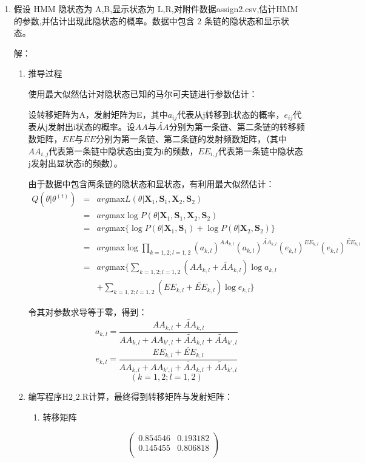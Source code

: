\documentclass{ctexart}
\begin{document}
\begin{enumerate}
\item 假设 HMM 隐状态为 A,B,显示状态为 L,R,对附件数据assign2.csv,估计HMM 的参数,并估计出现此隐状态的概率。数据中包含 2 条链的隐状态和显示状态。

解：
\begin{enumerate}

\item 推导过程

使用最大似然估计对隐状态已知的马尔可夫链进行参数估计：

设转移矩阵为A，发射矩阵为E，其中\(a_{ij}\)代表从j转移到i状态的概率，\(e_{ij}\)代表从j发射出i状态的概率。设\(AA与\tilde{AA}\)分别为第一条链、第二条链的转移频数矩阵，\(EE与\tilde{EE}\)分别为第一条链、第二条链的发射频数矩阵，（其中\(AA_{i,j}\)代表第一条链中隐状态由j变为i的频数，\(EE_{i,j}\)代表第一条链中隐状态j发射出显状态i的频数）。 

由于数据中包含两条链的隐状态和显状态，有利用最大似然估计：
\begin{eqnarray*}
Q(\theta|\theta^{(t)})&=&arg \mbox{max}L(\theta | \bm{X}_1,\bm{S}_1,\bm{X}_2,\bm{S}_2) \\
&=& arg \mbox{max} \log P(\theta | \bm{X}_1,\bm{S}_1,\bm{X}_2,\bm{S}_2) \\
&=&arg \mbox{max} \{ \log P(\theta | \bm{X}_1,\bm{S}_1)+\log P(\theta | \bm{X}_2,\bm{S}_2)\} \\
&=& arg \mbox{max} \log \prod_{k=1,2;l=1,2}(a_{k,l})^{AA_{k,l}}(a_{k,l})^{\tilde{AA}_{k,l}}(e_{k,l})^{EE_{k,l}}(e_{k,l})^{\tilde{EE}_{k,l} }\\
&=& arg \mbox{max} \{ \sum_{k=1,2;l=1,2} (AA_{k,l}+\tilde{AA}_{k,l}) \log a_{k,l} \\
&           &+\sum_{k=1,2;l=1,2}(EE_{k,l}+\tilde{EE}_{k,l}) \log e_{k,l} \}
\end{eqnarray*}

令其对参数求导等于零，得到：
\[a_{k,l} = \frac{AA_{k,l}+\tilde{AA}_{k,l}}{AA_{k,l}+AA_{k',l}+\tilde{AA}_{k,l}+\tilde{AA}_{k',l}}\]
\[e_{k,l} = \frac{EE_{k,l}+\tilde{EE}_{k,l}}{AA_{k,l}+AA_{k',l}+\tilde{AA}_{k,l}+\tilde{AA}_{k',l}}\]
\[(k=1,2;l=1,2)\]

\item 编写程序\(\mbox{H}2\_2.\mbox{R}\)计算，最终得到转移矩阵与发射矩阵：
\begin{enumerate}
\item 转移矩阵

\begin{equation*}
\left(
\begin{array}{ccc}
    0.854546 &  0.193182  \\
   0.145455& 0.806818 \\
   \end{array}
   \right)
  \end{equation*}




\end{enumerate}
\end{enumerate}
\end{enumerate}
\end{document}
